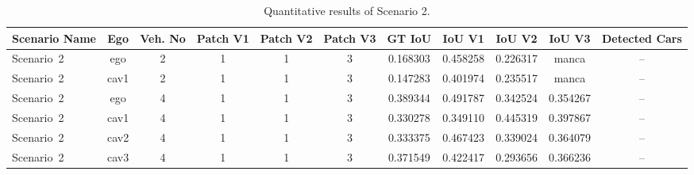 \begin{landscape}
\begin{table}[H]
    \centering
    \caption{Quantitative results of Scenario 2.}
    \label{tab:scenario2_results}
    \begin{tabularx}{\textwidth}{l c c c c c c c c c c}
        \toprule
        \textbf{Scenario Name} & 
        \textbf{Ego} &
        \textbf{Veh. No} &
        \textbf{Patch V1} &
        \textbf{Patch V2} &
        \textbf{Patch V3} &
        \textbf{GT IoU} & 
        \textbf{IoU V1} &
        \textbf{IoU V2} &
        \textbf{IoU V3} &
        \textbf{Detected Cars} \\
        \midrule %
        Scenario~2 & ego & 2 & 1 & 1 & 3 & 0.168303 & 0.458258 & 0.226317 & manca & --  \\
        Scenario~2 & cav1 & 2 & 1 & 1 & 3 & 0.147283 & 0.401974 & 0.235517 & manca & --  \\
        \midrule
        Scenario~2 & ego & 4 & 1 & 1 & 3 & 0.389344 & 0.491787 & 0.342524 & 0.354267 &  --  \\
        Scenario~2 & cav1 & 4 & 1 & 1 & 3 & 0.330278 & 0.349110 & 0.445319 & 0.397867 & --  \\
        Scenario~2 & cav2 & 4 & 1 & 1 & 3 & 0.333375 & 0.467423 & 0.339024 & 0.364079 & --  \\
        Scenario~2 & cav3 & 4 & 1 & 1 & 3 & 0.371549 & 0.422417 & 0.293656 & 0.366236 & --  \\
        \bottomrule
    \end{tabularx}
\end{table}
\end{landscape}